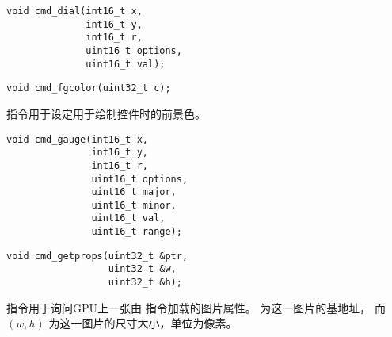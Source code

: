 \begin{framed}
\begin{verbatim}
void cmd_dial(int16_t x,
              int16_t y,
              int16_t r,
              uint16_t options,
              uint16_t val);
\end{verbatim}
\end{framed}



\begin{framed}
\begin{verbatim}
void cmd_fgcolor(uint32_t c);
\end{verbatim}
\end{framed}

 指令用于设定用于绘制控件时的前景色。
\style


\begin{framed}
\begin{verbatim}
void cmd_gauge(int16_t x,
               int16_t y,
               int16_t r,
               uint16_t options,
               uint16_t major,
               uint16_t minor,
               uint16_t val,
               uint16_t range);
\end{verbatim}
\end{framed}




\begin{framed}
\begin{verbatim}
void cmd_getprops(uint32_t &ptr,
                  uint32_t &w,
                  uint32_t &h);
\end{verbatim}
\end{framed}

 指令用于询问GPU上一张由  指令加载的图片属性。
 为这一图片的基地址， 而 $(w, h)$ 为这一图片的尺寸大小，单位为像素。


